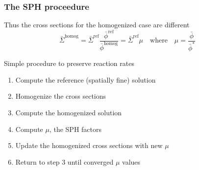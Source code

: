 \documentclass[fleqn]{beamer}
\begin{document}
    \begin{frame}
        \frametitle{The SPH proceedure}
        \begin{block}{Thus the cross sections for the homogenized case are different}
            \begin{equation*}
                \bar{\Sigma}^\text{homog} = \bar{\Sigma}^\text{ref}\frac{\bar{\phi}^\text{ref}}{\bar{\phi}^\text{homog}} = \bar{\Sigma}^\text{ref}\mu
                \quad\text{where}\quad
                \mu=\frac{\bar{\phi}}{\bar{\phi}^*}
            \end{equation*}
        \end{block}
        \begin{block}{Simple procedure to preserve reaction rates}
            \begin{enumerate}
                \item Compute the reference (spatially fine) solution
                \item Homogenize the cross sections
                \item Compute the homogenized solution
                \item Compute $\mu$, the SPH factors
                \item Update the homogenized cross sections with new $\mu$
                \item Return to step 3 until converged $\mu$ values
            \end{enumerate}
        \end{block}
    \end{frame}
\end{document}
